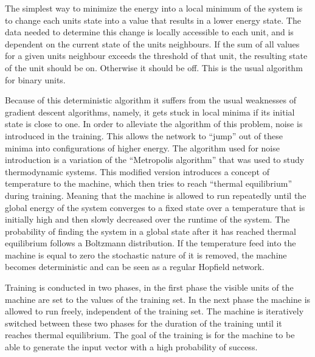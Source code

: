 The simplest way to minimize the energy into a local minimum of the system is to change each units state into a value that results in a lower energy state. The data needed to determine this change is locally accessible to each unit, and is dependent on the current state of the units neighbours. If the sum of all values for a given units neighbour exceeds the threshold of that unit, the resulting state of the unit should be on. Otherwise it should be off. This is the usual algorithm for binary units.

Because of this deterministic algorithm it suffers from the usual weaknesses of gradient descent algorithms, namely, it gets stuck in local minima if its initial state is close to one. In order to alleviate the algorithm of this problem, noise is introduced in the training. This allows the network to ``jump'' out of these minima into configurations of higher energy. The algorithm used for noise introduction is a variation of the ``Metropolis algorithm'' \cite{metropolis1953equation} that was used to study thermodynamic systems. This modified version introduces a concept of temperature to the machine, which then tries to reach ``thermal equilibrium'' during training. Meaning that the machine is allowed to run repeatedly until the global energy of the system converges to a fixed state over a temperature that is initially high and then slowly decreased over the runtime of the system. The probability of finding the system in a global state after it has reached thermal equilibrium follows a Boltzmann distribution. If the temperature feed into the machine is equal to zero the stochastic nature of it is removed, the machine becomes deterministic and can be seen as a regular Hopfield network.


Training is conducted in two phases, in the first phase the visible units of the machine are set to the values of the training set. In the next phase the machine is allowed to run freely, independent of the training set. The machine is iteratively switched between these two phases for the duration of the training until it reaches thermal equilibrium. The goal of the training is for the machine to be able to generate the input vector with a high probability of success.

